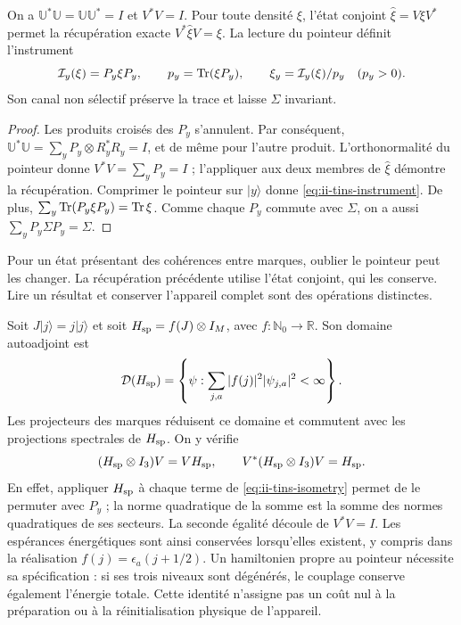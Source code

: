 \begin{proposition}
\label{prop:ii-tins-instrument}
On a $\mathbb U^*\mathbb U=\mathbb U\mathbb U^*=I$ et $V^*V=I$.
Pour toute densité $\xi$, l’état conjoint $\widehat\xi=V\xi V^*$
permet la récupération exacte $V^*\widehat\xi V=\xi$. La lecture du
pointeur définit l’instrument
\begin{equation}
 \mathcal I_y(\xi)=P_y\xi P_y,\qquad
 p_y=\operatorname{Tr}(\xi P_y),\qquad
 \xi_y=\mathcal I_y(\xi)/p_y\quad(p_y>0).
 \label{eq:ii-tins-instrument}
\end{equation}
Son canal non sélectif préserve la trace et laisse $\Sigma$ invariant.
\end{proposition}
\begin{proof}
Les produits croisés des $P_y$ s’annulent. Par conséquent,
$\mathbb U^*\mathbb U=\sum_yP_y\otimes R_y^*R_y=I$, et de même
pour l’autre produit. L’orthonormalité du pointeur donne $V^*V=\sum_yP_y=I$ ;
l’appliquer aux deux membres de $\widehat\xi$ démontre la récupération.
Comprimer le pointeur sur $|y\rangle$ donne \eqref{eq:ii-tins-instrument}.
De plus, $\sum_y\operatorname{Tr}(P_y\xi P_y)=\operatorname{Tr}\xi$. Comme chaque $P_y$ commute avec
$\Sigma$, on a aussi $\sum_yP_y\Sigma P_y=\Sigma$.
\end{proof}

Pour un état présentant des cohérences entre marques, oublier le pointeur peut
les changer. La récupération précédente utilise l’état conjoint, qui les
conserve. Lire un résultat et conserver l’appareil complet sont des opérations
distinctes.

Soit $J|j\rangle=j|j\rangle$ et soit $H_{\rm sp}=f(J)\otimes I_M$, avec
$f:\mathbb N_0\to\mathbb R$. Son domaine autoadjoint est
\[
 \mathcal D(H_{\rm sp})=
 \left\{\psi:\sum_{j,a}|f(j)|^2|\psi_{j,a}|^2<\infty\right\}.
\]
Les projecteurs des marques réduisent ce domaine et commutent avec les
projections spectrales de $H_{\rm sp}$. On y vérifie
\begin{equation}
 (H_{\rm sp}\otimes I_3)V=VH_{\rm sp},\qquad
 V^*(H_{\rm sp}\otimes I_3)V=H_{\rm sp}.
 \label{eq:ii-tins-energy}
\end{equation}
En effet, appliquer $H_{\rm sp}$ à chaque terme de
\eqref{eq:ii-tins-isometry} permet de le permuter avec $P_y$ ; la norme
quadratique de la somme est la somme des normes quadratiques de ses secteurs.
La seconde égalité découle de $V^*V=I$. Les espérances
énergétiques sont ainsi conservées lorsqu’elles existent, y compris dans la réalisation
$f(j)=\epsilon_a(j+1/2)$. Un hamiltonien propre au pointeur nécessite sa
spécification : si ses trois niveaux sont dégénérés, le couplage conserve
également l’énergie totale. Cette identité n’assigne pas un coût nul à la
préparation ou à la réinitialisation physique de l’appareil.

